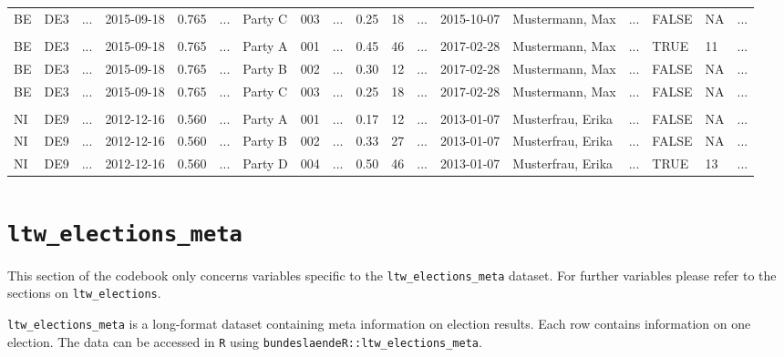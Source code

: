 \documentclass[
]{scrartcl}
\begin{document}
\begin{landscape}
\begin{table}
{\begin{tabular}{llrllrllrllrllrllr}
        BE & DE3 & ... & 2015-09-18 & 0.765 & ... & Party C & 003 & ... & 0.25 & 18 & ...& 2015-10-07 & Mustermann, Max & ... & FALSE & NA & ... \\
        &&&&&&&&&&&\\[-2ex]
        BE & DE3 & ... & 2015-09-18 & 0.765 & ... & Party A & 001 & ... & 0.45 & 46 & ... & 2017-02-28 & Mustermann, Max & ... & TRUE & 11 & ... \\
        BE & DE3 & ... & 2015-09-18 & 0.765 & ... & Party B & 002 & ... & 0.30 & 12 & ... & 2017-02-28 & Mustermann, Max & ... & FALSE & NA & ...\\
        BE & DE3 & ... & 2015-09-18 & 0.765 & ... & Party C & 003 & ... & 0.25 & 18 & ... & 2017-02-28 & Mustermann, Max & ... & FALSE & NA & ...\\
        &&&&&&&&&&&\\
        NI & DE9 & ... & 2012-12-16 & 0.560 & ... & Party A & 001 & ... & 0.17 & 12 & ... & 2013-01-07 & Musterfrau, Erika & ... & FALSE & NA & ...\\
        NI & DE9 & ... & 2012-12-16 & 0.560 & ... & Party B & 002 & ... & 0.33 & 27 & ... & 2013-01-07 & Musterfrau, Erika & ... & FALSE & NA & ...\\
        NI & DE9 & ... & 2012-12-16 & 0.560 & ... & Party D & 004 & ... & 0.50 & 46 & ... & 2013-01-07 & Musterfrau, Erika & ... & TRUE & 13 & ...\\
        \bottomrule
\end{tabular}}
\end{table}

\end{landscape}

\newpage

\hypertarget{ltw_elections_meta}{%
\section{\texorpdfstring{\texttt{ltw\_elections\_meta}}{ltw\_elections\_meta}}\label{ltw_elections_meta}}

This section of the codebook only concerns variables specific to the
\texttt{ltw\_elections\_meta} dataset. For further variables please
refer to the sections on \texttt{ltw\_elections}.

\texttt{ltw\_elections\_meta} is a long-format dataset containing meta
information on election results. Each row contains information on one
election. The data can be accessed in \texttt{R} using
\texttt{bundeslaendeR::ltw\_elections\_meta}.
\end{document}
